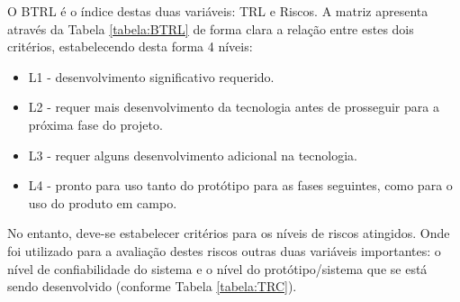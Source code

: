 O BTRL é o índice destas duas variáveis: TRL e Riscos. A matriz apresenta através da Tabela \ref{tabela:BTRL} de forma clara a relação entre estes dois critérios, estabelecendo desta forma 4 níveis:
\begin{itemize}
	\item L1 - desenvolvimento significativo requerido.
	\item L2 - requer mais desenvolvimento da tecnologia antes de prosseguir para a próxima fase do projeto.
	\item L3 - requer alguns desenvolvimento adicional na tecnologia.
	\item L4 - pronto para uso tanto do protótipo para as fases seguintes, como para o uso do produto em campo.
\end{itemize}
No entanto, deve-se estabelecer critérios para os níveis de riscos atingidos. Onde foi utilizado para a avaliação destes riscos outras duas variáveis importantes: o nível de confiabilidade do sistema e o nível do protótipo/sistema que se está sendo desenvolvido (conforme Tabela \ref{tabela:TRC}).

